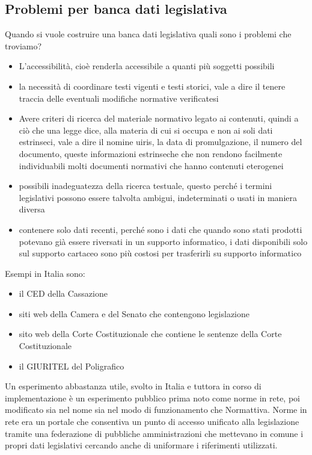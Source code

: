 \subsection{Problemi per banca dati legislativa}
Quando si vuole costruire una banca dati legislativa quali sono i problemi che troviamo? 
\begin{itemize}
    \item L'accessibilità, cioè renderla accessibile a quanti più soggetti possibili
    \item  la necessità di coordinare testi vigenti e testi storici, vale a dire il tenere traccia delle eventuali modifiche normative verificatesi
    \item Avere criteri di ricerca del materiale normativo legato ai contenuti, quindi a ciò che una legge dice, alla materia di cui si occupa e non ai soli dati estrinseci, vale a dire il nomine uiris, la data di promulgazione, il numero del documento, queste informazioni estrinseche che non rendono facilmente individuabili molti documenti normativi che hanno contenuti eterogenei
    \item  possibili inadeguatezza della ricerca testuale, questo perché i termini legislativi possono essere talvolta ambigui, indeterminati o usati in maniera diversa
    \item contenere solo dati recenti, perché sono i dati che quando sono stati prodotti potevano già essere riversati in un supporto informatico, i dati disponibili solo sul supporto cartaceo sono più costosi per trasferirli su supporto informatico
\end{itemize}

Esempi in Italia sono:
\begin{itemize}
    \item il CED della Cassazione
    \item  siti web della Camera e del Senato che contengono legislazione
    \item sito web della Corte Costituzionale che contiene le sentenze della Corte Costituzionale
    \item il GIURITEL del Poligrafico
\end{itemize}
Un esperimento abbastanza utile, svolto in Italia e tuttora in corso di implementazione è un esperimento pubblico prima noto come norme in rete, poi modificato sia nel nome sia nel modo di funzionamento che Normattiva. 
Norme in rete era un portale che consentiva un punto di accesso unificato alla legislazione tramite una federazione di pubbliche amministrazioni che mettevano in comune i propri dati legislativi cercando anche di uniformare i riferimenti utilizzati.
